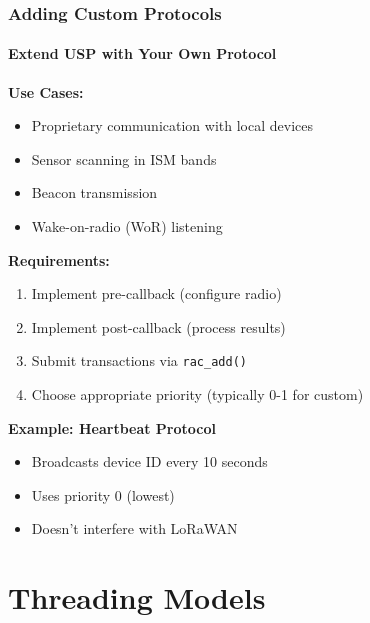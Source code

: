\documentclass{beamer}
\begin{document}
\begin{frame}
\frametitle{Adding Custom Protocols}
\framesubtitle{Extend USP with Your Own Protocol}

\textbf{Use Cases:}
\begin{itemize}
    \item Proprietary communication with local devices
    \item Sensor scanning in ISM bands
    \item Beacon transmission
    \item Wake-on-radio (WoR) listening
\end{itemize}

\vspace{1em}

\textbf{Requirements:}
\begin{enumerate}
    \item Implement pre-callback (configure radio)
    \item Implement post-callback (process results)
    \item Submit transactions via \texttt{rac\_add()}
    \item Choose appropriate priority (typically 0-1 for custom)
\end{enumerate}

\vspace{1em}

\textbf{Example: Heartbeat Protocol}
\begin{itemize}
    \item Broadcasts device ID every 10 seconds
    \item Uses priority 0 (lowest)
    \item Doesn't interfere with LoRaWAN
\end{itemize}
\end{frame}

\section{Threading Models}
\end{document}

